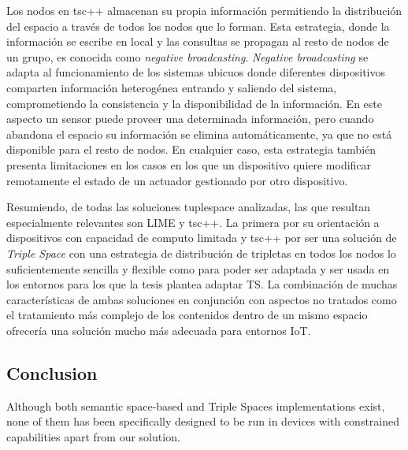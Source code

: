 Los nodos en tsc++ almacenan su propia información permitiendo la distribución del espacio a través de todos los nodos que lo forman. Esta estrategia, donde la información se escribe en local y las consultas se propagan al resto de nodos de un grupo, es conocida como \textit{negative broadcasting}. \textit{Negative broadcasting} se adapta al funcionamiento de los sistemas ubicuos donde diferentes dispositivos comparten información heterogénea entrando y saliendo del sistema, comprometiendo la consistencia y la disponibilidad de la información. En este aspecto un sensor puede proveer una determinada información, pero cuando abandona el espacio su información se elimina automáticamente, ya que no está disponible para el resto de nodos. En cualquier caso, esta estrategia también presenta limitaciones en los casos en los que un dispositivo quiere modificar remotamente el estado de un actuador gestionado por otro dispositivo.

Resumiendo, de todas las soluciones tuplespace analizadas, las que resultan especialmente relevantes son LIME y tsc++. La primera por su orientación a dispositivos con capacidad de computo limitada y tsc++ por ser una solución de \textit{Triple Space} con una estrategia de distribución de tripletas en todos los nodos lo suficientemente sencilla y flexible como para poder ser adaptada y ser usada en los entornos para los que la tesis plantea adaptar TS. La combinación de muchas características de ambas soluciones en conjunción con aspectos no tratados como el tratamiento más complejo de los contenidos dentro de un mismo espacio ofrecería una solución mucho más adecuada para entornos IoT.



\subsection{Conclusion}


Although both semantic space-based and Triple Spaces implementations exist, none of them has been specifically designed to be run in devices with constrained capabilities apart from our solution.